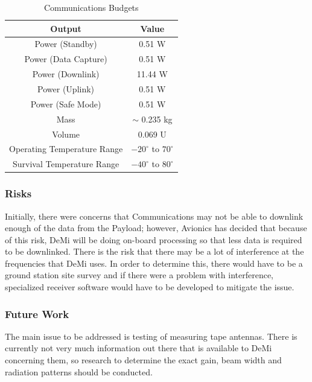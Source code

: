 \documentclass[12pt]{article}
\begin{document}
\begin{table}[ht]
\caption{Communications Budgets}
\begin{center}
    \begin{tabular}{|c||c|} \hline
    	\textbf{Output} & \textbf{Value} \\ \hline \hline
    Power (Standby) & 0.51 W  \\
    Power (Data Capture) & 0.51 W \\
    Power (Downlink) & 11.44 W \\
    Power (Uplink) & 0.51 W \\
    Power (Safe Mode) & 0.51 W \\
    Mass & $\sim$ 0.235 kg  \\
    Volume & 0.069 U \\ 
Operating Temperature Range & $-20^\circ$ to $70^\circ$ \\
Survival Temperature Range & $-40^\circ$ to $80^\circ$ \\ \hline 
    \end{tabular}\label{table:comm_summary_outputs}
\end{center}
\end{table}

			\subsubsection{Risks}
			Initially, there were concerns that Communications may not be able to downlink enough of the
data from the Payload; however, Avionics has decided that because of this risk, DeMi will be
doing on-board processing so that less data is required to be downlinked. There is the risk
that there may be a lot of interference at the frequencies that DeMi uses. In order to determine
this, there would have to be a ground station site survey and if there were a problem with
interference, specialized receiver software would have to be developed to mitigate the issue.

			\subsubsection{Future Work}
The main issue to be addressed is testing of measuring tape antennas. There is currently not very much information out there that is available to DeMi concerning them, so research to determine the exact gain, beam width and radiation patterns should be conducted.

\newpage
\FloatBarrier
\end{document}
